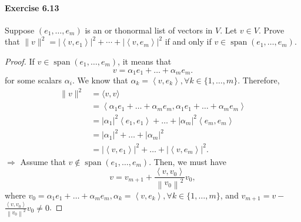 \documentclass{article}
\theoremstyle{definition}
\begin{document}
\paragraph{Exercise 6.13} Suppose $\left(e_{1}, \ldots, e_{m}\right)$ is an or thonormal list of vectors in $V$. Let $v \in V$. Prove that $\|v\|^{2}=\left|\left\langle v, e_{1}\right\rangle\right|^{2}+\cdots+\left|\left\langle v, e_{m}\right\rangle\right|^{2}$ if and only if $v \in \operatorname{span}\left(e_{1}, \ldots, e_{m}\right)$.
\begin{proof}
If $v \in \operatorname{span}\left(e_1, \ldots, e_m\right)$, it means that
$$
v=\alpha_1 e_1+\ldots+\alpha_m e_m .
$$
for some scalars $\alpha_i$. We know that $\alpha_k=\left\langle v, e_k\right\rangle, \forall k \in\{1, \ldots, m\}$. Therefore,
$$
\begin{aligned}
\|v\|^2 & =\langle v, v\rangle \\
& =\left\langle\alpha_1 e_1+\ldots+\alpha_m e_m, \alpha_1 e_1+\ldots+\alpha_m e_m\right\rangle \\
& =\left|\alpha_1\right|^2\left\langle e_1, e_1\right\rangle+\ldots+\left|\alpha_m\right|^2\left\langle e_m, e_m\right\rangle \\
& =\left|\alpha_1\right|^2+\ldots+\left|\alpha_m\right|^2 \\
& =\left|\left\langle v, e_1\right\rangle\right|^2+\ldots+\left|\left\langle v, e_m\right\rangle\right|^2 .
\end{aligned}
$$
$\Rightarrow$ Assume that $v \notin \operatorname{span}\left(e_1, \ldots, e_m\right)$. Then, we must have
$$
v=v_{m+1}+\frac{\left\langle v, v_0\right\rangle}{\left\|v_0\right\|^2} v_0,
$$
where $v_0=\alpha_1 e_1+\ldots+\alpha_m e_m, \alpha_k=\left\langle v, e_k\right\rangle, \forall k \in\{1, \ldots, m\}$, and $v_{m+1}=v-$ $\frac{\left\langle v, v_0\right\rangle}{\left\|v_0\right\|^2} v_0 \neq 0$.


\end{proof}
\end{document}
